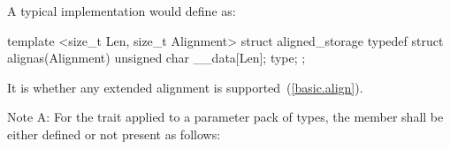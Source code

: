 %
\pnum
\begin{note} A typical implementation would define  as:

\begin{codeblock}
template <size_t Len, size_t Alignment>
struct aligned_storage {
  typedef struct {
    alignas(Alignment) unsigned char __data[Len];
  } type;
};
\end{codeblock}
\end{note}

\pnum
It is  whether any extended alignment is
supported~(\ref{basic.align}).

%
\pnum
Note A:
For the  trait applied to a parameter pack  of types,
the member  shall be either defined or not present as follows:

